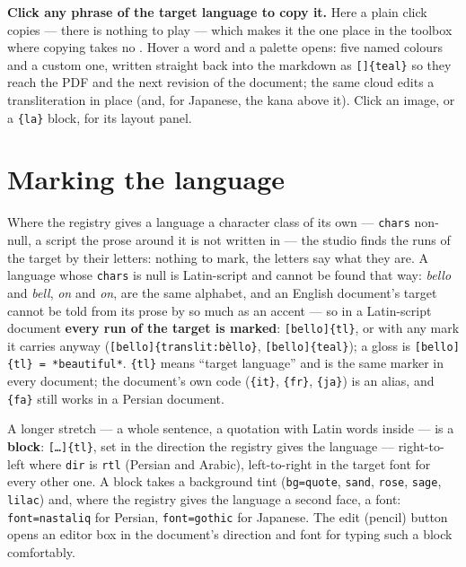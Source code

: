 \documentclass[11pt,oneside]{report}
\newcommand{\pw}[1]{\babelsublr{\mbox{\foreignlanguage{persian}{#1}}}}
\newcommand{\iw}[1]{\foreignlanguage{italian}{\emph{#1}}}
\newcommand{\fw}[1]{\foreignlanguage{french}{\emph{#1}}}
\newcommand{\key}[1]{\textsf{\small\fbox{#1}}}
\newcommand{\menu}[1]{\textsf{#1}}
\begin{document}
\textbf{Click any phrase of the target language to copy it.} Here a plain
click copies --- there is nothing to play --- which makes it the one place
in the toolbox where copying takes no \key{shift}. Hover a word and a
palette opens: five named colours and a custom one, written straight back
into the markdown as \texttt{[}\pw{متن}\texttt{]\{teal\}} so they reach the
PDF and the next revision of the document; the same cloud edits a
transliteration in place (and, for Japanese, the kana above it). Click an
image, or a \texttt{\{la\}} block, for its layout panel.

\section{Marking the language}
\label{sec:latin-marks}

Where the registry gives a language a character class of its own ---
\texttt{chars} non-null, a script the prose around it is not written in ---
the studio finds the runs of the target by their letters: nothing to mark,
the letters say what they are. A language whose \texttt{chars} is null is
Latin-script and cannot be found that way: \iw{bello} and \emph{bell},
\fw{on} and \emph{on}, are the same alphabet, and an English document's
target cannot be told from its prose by so much as an accent --- so in a
Latin-script document \textbf{every run of the target is marked}:
\texttt{[bello]\{tl\}}, or with any mark it carries anyway
(\texttt{[bello]\{translit:bèllo\}}, \texttt{[bello]\{teal\}}); a gloss is
\texttt{[bello]\{tl\} = *beautiful*}. \texttt{\{tl\}} means ``target
language'' and is the same marker in every document; the document's own
code (\texttt{\{it\}}, \texttt{\{fr\}}, \texttt{\{ja\}}) is an alias, and
\texttt{\{fa\}} still works in a Persian document.

A longer stretch --- a whole sentence, a quotation with Latin words inside
--- is a \textbf{block}: \texttt{[\ldots]\{tl\}}, set in the direction the
registry gives the language --- right-to-left where \texttt{dir} is
\texttt{rtl} (Persian and Arabic), left-to-right in the target font for
every other one. A block takes a background tint (\texttt{bg=quote},
\texttt{sand}, \texttt{rose}, \texttt{sage}, \texttt{lilac}) and, where
the registry gives the language a second face, a font:
\texttt{font=nastaliq} for Persian, \texttt{font=gothic} for Japanese. The
\menu{edit} (pencil) button opens an editor box in the document's direction
and font for typing such a block comfortably.
\end{document}
